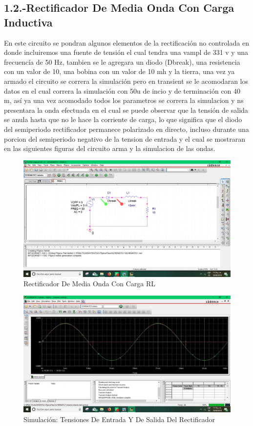 \documentclass[10pt,a4paper]{article}
\begin{document}
\subsection{1.2.-Rectificador De Media Onda Con Carga Inductiva}
En este circuito se pondran algunos elementos de la rectificación no controlada en donde incluiremos una fuente de tensión el cual tendra una vampl de 331 v y una frecuencía de 50 Hz, tambien se le agregara un diodo (Dbreak), una resistencia con un valor de 10, una bobina con un valor de 10 mh y la tierra, una vez ya armado el circuito se correra la simulación pero en transient se le acomodaran los datos en el cual correra la simulación con 50u de incio y de terminación con 40 m, así ya una vez acomodado todos los parametros se correra la simulacion y ns presentara la onda efectuada en el cual se puede observar que la tensión de salida se anula hasta que no le hace la corriente de carga, lo que significa que el diodo del semiperiodo rectificador permanece polarizado en directo, incluso durante una porcion del semiperiodo negativo de la tension de entrada y el cual se mostraran en las siguientes figuras del circuito arma y la simulacion de las ondas.

\begin{figure}[hbtp]
\centering
\includegraphics[scale=0.2]{02.jpeg}
\caption{Rectificador De Media Onda Con Carga RL}
\end{figure}
\begin{figure}[hbtp]
\centering
\includegraphics[scale=0.2]{2.jpeg}
\caption{ Simulación: Tensiones De Entrada Y De Salida Del Rectificador}
\end{figure}
\end{document}
